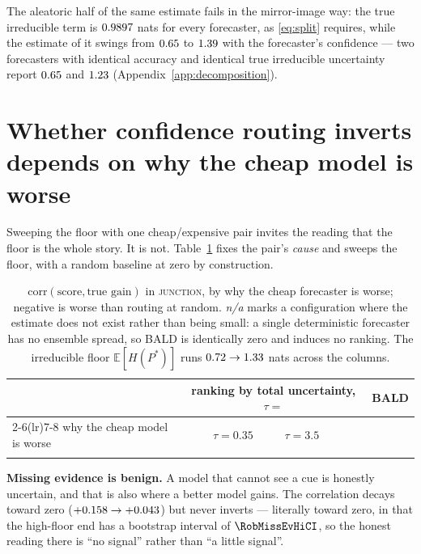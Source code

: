 \documentclass[10pt]{article}
\newcommand{\Pstar}{P^{*}}
\begin{document}
The aleatoric half of the same estimate fails in the mirror-image way: the true irreducible term is
$0.9897$ nats for every forecaster, as \eqref{eq:split} requires, while the estimate of it
swings from $0.65$ to $1.39$ with the forecaster's confidence --- two forecasters
with identical accuracy and identical true irreducible uncertainty report $0.65$ and
$1.23$ (Appendix~\ref{app:decomposition}).

\section{Whether confidence routing inverts depends on why the cheap model is worse}
\label{sec:mechanisms}

Sweeping the floor with one cheap/expensive pair invites the reading that the floor is the whole
story. It is not. Table~\ref{tab:mechanisms} fixes the pair's \emph{cause} and sweeps the floor,
with a random baseline at zero by construction.

\begin{table}[t]
\centering
\small
\caption{$\mathrm{corr}(\text{score}, \text{true gain})$ in \textsc{junction}, by why the cheap
forecaster is worse; negative is worse than routing at random. \emph{n/a} marks a configuration
where the estimate does not exist rather than being small: a single deterministic forecaster has no
ensemble spread, so BALD is identically zero and induces no ranking. The irreducible floor
$\mathbb{E}[H(\Pstar)]$ runs $0.72 \to 1.33$ nats across the columns.}
\label{tab:mechanisms}
\begin{tabular}{lccccccc}
\toprule
& \multicolumn{5}{c}{ranking by total uncertainty, $\tau =$} & \multicolumn{2}{c}{BALD} \\
\cmidrule(lr){2-6}\cmidrule(lr){7-8}
why the cheap model is worse &  & $\tau{=}0.35$ & $\tau{=}3.5$ \\
\midrule
 \\
\bottomrule
\end{tabular}
\end{table}

\textbf{Missing evidence is benign.} A model that cannot see a cue is honestly uncertain, and that
is also where a better model gains. The correlation decays toward zero
($+0.158 \to +0.043$) but never inverts --- literally toward zero, in that the
high-floor end has a bootstrap interval of $\RobMissEvHiCI$, so the honest reading there is
``no signal'' rather than ``a little signal''.
\end{document}
